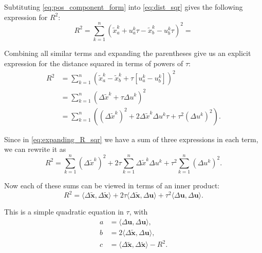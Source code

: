 \documentclass{article}
\renewcommand{\vec}[1]{\bm{#1}}
\newcommand{\iprod}[2]{\langle #1, #2 \rangle}
\begin{document}
\begin{enumerate}
        Subtituting \autoref{eq:pos_component_form} into \autoref{eq:dist_sqr} gives the following expression for $R^2$:
        \begin{equation}
            R^{2} = \sum\limits_{k=1}^{n}\left(\tilde{x}^{k}_{a} + u_{a}^{k}\tau - \tilde{x}^{k}_{b} - u_{b}^{k}\tau\right)^{2} = 
            \label{eq:R_sqr_comp_form}
        \end{equation}

        Combining all similar terms and expanding the parentheses give us an explicit expression for the distance squared in terms of powers of $\tau$:
        \begin{align}
            R^{2} &= \sum\limits_{k=1}^{n}\left(\tilde{x}_{a}^{k}-\tilde{x}_{b}^{k}+\tau\left[u_{a}^{k}-u_{b}^{k}\right]\right)^{2}\nonumber\\
                  &= \sum\limits_{k=1}^{n}\left(\Delta \tilde{x}^{k}+\tau\Delta u^{k}\right)^{2}\nonumber\\
                  &= \sum\limits_{k=1}^{n}\left(\left(\Delta\tilde{x}^{k}\right)^{2}+2\Delta\tilde{x}^{k}\Delta u^{k}\tau + \tau^{2}\left(\Delta u^{k}\right)^{2}\right).
            \label{eq:expanding_R_sqr}
        \end{align}

        Since in \autoref{eq:expanding_R_sqr} we have a sum of three expressions in each term, we can rewrite it as
        \begin{equation}
            R^{2} = \sum\limits_{k=1}^{n}\left(\Delta\tilde{x}^{k}\right)^{2} + 2\tau\sum\limits_{k=1}^{n}\Delta\tilde{x}^{k}\Delta u^{k} + \tau^{2}\sum\limits_{k=1}^{n}\left(\Delta u^{k}\right)^{2}.
            \label{eq:many_sums}
        \end{equation}

        Now each of these sums can be viewed in terms of an inner product:
        \begin{equation}
            R^{2} = \iprod{\Delta\tilde{\vec{x}}}{\Delta\tilde{\vec{x}}} + 2\tau\iprod{\Delta\tilde{\vec{x}}}{\Delta\vec{u}} + \tau^{2}\iprod{\Delta\vec{u}}{\Delta\vec{u}}.
            \label{eq:sums_to_inner_prods}
        \end{equation}

        This is a simple quadratic equation in $\tau$, with 
        \begin{align}
            a &= \iprod{\Delta{\vec{u}}}{\Delta{\vec{u}}},\nonumber\\
            b &= 2\iprod{\Delta\tilde{\vec{x}}}{\Delta{\vec{u}}},\nonumber\\
            c &= \iprod{\Delta\tilde{\vec{x}}}{\Delta\tilde{\vec{x}}} - R^{2}.
            \label{eq:quadratic}
        \end{align}


\end{enumerate}
\end{document}
